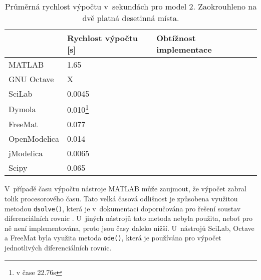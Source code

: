 \begin{savenotes}
\begin{table}[ht]
\centering
\begin{tabular}{|l|l|l|}
\hline
             & Rychlost výpočtu {[}s{]} & Obtížnost implementace \\ \hline
MATLAB       &         1.65                 &  \\ \hline
GNU Octave   &           X               &  \\ \hline
SciLab       &            0.0045              &  \\ \hline
Dymola       &           0.010\footnote{v čase 22.76s}               &  \\ \hline
FreeMat &                  0.077        &  \\ \hline
OpenModelica    &        0.014                  &  \\ \hline
jModelica        &       0.0065              &  \\ \hline
Scipy             &      0.065                    &  \\ \hline
\end{tabular}
\caption{Průměrná rychlost výpočtu v~sekundách pro model 2. Zaokrouhleno na dvě platná desetinná místa.}
\label{tab:kruh-tabulka}
\end{table}
\end{savenotes}

V~případě času výpočtu nástroje MATLAB může zaujmout, že výpočet zabral tolik procesorového času. Tato velká časová odlišnost je způsobena využitou metodou \texttt{dsolve()}, která je v~dokumentaci doporučována pro řešení soustav diferenciálních rovnic \cite{MATLAB:2010}. U~jiných nástrojů tato metoda nebyla použita, neboť pro ně není implementována, proto jsou časy daleko nižší. U~nástrojů SciLab, Octave a FreeMat byla využita metoda \texttt{ode()}, která je používána pro výpočet jednotlivých diferenciálních rovnic.

